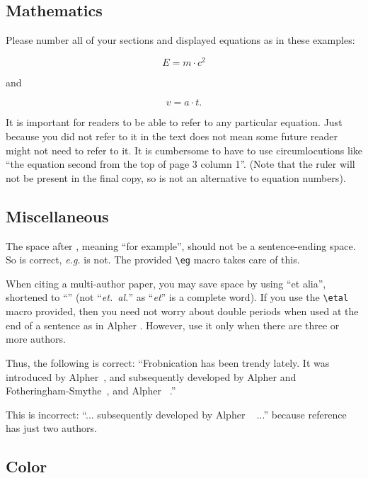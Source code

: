 \documentclass[10pt,twocolumn,letterpaper]{article}
\begin{document}
\subsection{Mathematics}

Please number all of your sections and displayed equations as in these examples:

\begin{equation}
  E = m\cdot c^2
  \label{eq:important}
\end{equation}

and

\begin{equation}
  v = a\cdot t.
  \label{eq:also-important}
\end{equation}

It is important for readers to be able to refer to any particular equation. Just because you did not refer to it in the text does not mean some future reader might not need to refer to it. It is cumbersome to have to use circumlocutions like ``the equation second from the top of page 3 column 1''. (Note that the ruler will not be present in the final copy, so is not an alternative to equation numbers).


\subsection{Miscellaneous}

The space after \eg, meaning ``for example'', should not be a sentence-ending space. So \eg is correct, {\em e.g.} is not. The provided \verb'\eg' macro takes care of this.

When citing a multi-author paper, you may save space by using ``et alia'', shortened to ``\etal'' (not ``{\em et.\ al.}'' as ``{\em et}'' is a complete word). If you use the \verb'\etal' macro provided, then you need not worry about double periods when used at the end of a sentence as in Alpher \etal. However, use it only when there are three or more authors.

Thus, the following is correct:
   ``Frobnication has been trendy lately.
   It was introduced by Alpher~\cite{Alpher02}, and subsequently developed by
   Alpher and Fotheringham-Smythe~\cite{Alpher03}, and Alpher \etal~\cite{Alpher04}.''

This is incorrect: ``... subsequently developed by Alpher \etal~\cite{Alpher03} ...'' because reference~\cite{Alpher03} has just two authors.


\subsection{Color}
\end{document}
